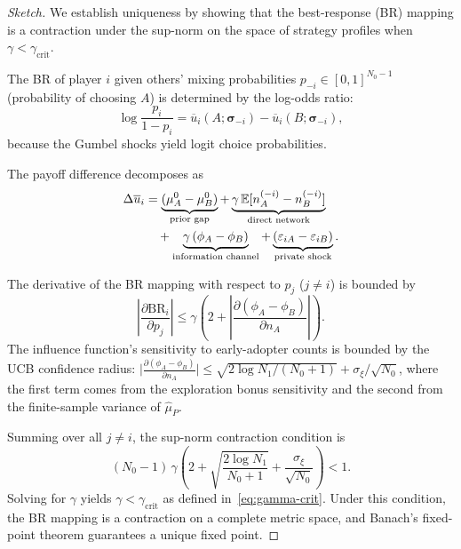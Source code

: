\documentclass[12pt,a4paper]{article}
\newcommand{\E}{\mathbb{E}}
\newcommand{\BR}{\mathrm{BR}}
\begin{document}
\begin{proof}[Sketch]
We establish uniqueness by showing that the best-response (BR) mapping is a
contraction under the sup-norm on the space of strategy profiles when
$\gamma<\gamma_{\text{crit}}$.

\medskip\noindent
The BR of player $i$ given others' mixing probabilities
$p_{-i}\in[0,1]^{N_0-1}$ (probability of choosing $A$) is determined by
the log-odds ratio:
\begin{equation}\label{eq:log-odds}
    \log\frac{p_i}{1-p_i} =
    \overline{u}_i(A;\boldsymbol{\sigma}_{-i})
    - \overline{u}_i(B;\boldsymbol{\sigma}_{-i}),
\end{equation}
because the Gumbel shocks yield logit choice probabilities.

\medskip\noindent
The payoff difference decomposes as
\begin{align}
    \Delta\overline{u}_i &=
    \underbrace{(\mu_A^0-\mu_B^0)}_{\text{prior gap}}
    + \underbrace{\gamma\,\E[n_A^{(-i)}-n_B^{(-i)}]}_{\text{direct network}}
    \notag\\
    &\quad + \underbrace{\gamma\,(\phi_A-\phi_B)}_{\text{information channel}}
    + \underbrace{(\varepsilon_{iA}-\varepsilon_{iB})}_{\text{private shock}}.
    \label{eq:payoff-diff}
\end{align}

\medskip\noindent
The derivative of the BR mapping with respect to $p_j$ ($j\neq i$) is
bounded by
\begin{equation}\label{eq:br-deriv}
    \left|\frac{\partial \BR_i}{\partial p_j}\right|
    \leq \gamma\left(
        2 + \left|\frac{\partial(\phi_A-\phi_B)}{\partial n_A}\right|
    \right).
\end{equation}
The influence function's sensitivity to early-adopter counts is bounded by
the UCB confidence radius:
$\big|\frac{\partial(\phi_A-\phi_B)}{\partial n_A}\big|
\leq \sqrt{2\log N_1/(N_0+1)} + \sigma_\xi/\sqrt{N_0}$,
where the first term comes from the exploration bonus sensitivity and the
second from the finite-sample variance of $\hat{\mu}_P$.

\medskip\noindent
Summing over all $j\neq i$, the sup-norm contraction condition is
\begin{equation}\label{eq:contraction}
    (N_0-1)\,\gamma\left(
        2 + \sqrt{\frac{2\log N_1}{N_0+1}}
        + \frac{\sigma_\xi}{\sqrt{N_0}}
    \right) < 1.
\end{equation}
Solving for $\gamma$ yields $\gamma<\gamma_{\text{crit}}$ as defined
in~\eqref{eq:gamma-crit}.  Under this condition, the BR mapping is a
contraction on a complete metric space, and Banach's fixed-point theorem
guarantees a unique fixed point.
\end{proof}
\end{document}
